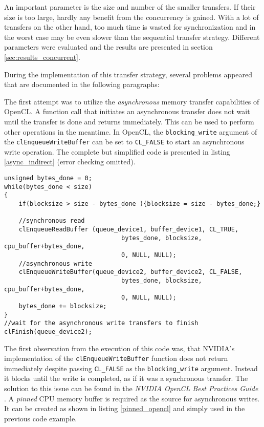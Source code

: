 An important parameter is the size and number of the smaller transfers.
If their size is too large, hardly any benefit from the concurrency is gained.
With a lot of transfers on the other hand, too much time is wasted for synchronization and in the worst case may be even slower than the sequential transfer strategy.
Different parameters were evaluated and the results are presented in section \ref{sec:results_concurrent}.


During the implementation of this transfer strategy, several problems appeared that are documented in the following paragraphs:

The first attempt was to utilize the \emph{asynchronous} memory transfer capabilities of OpenCL.
A function call that initiates an asynchronous transfer does not wait until the transfer is done and returns immediately.
This can be used to perform other operations in the meantime.
In OpenCL, the \texttt{blocking\_write} argument of the \texttt{clEnqueueWriteBuffer} can be set to \texttt{CL\_FALSE} to start an asynchronous write operation.
The complete but simplified code is presented in listing \ref{async_indirect} (error checking omitted).

\begin{lstlisting}[label=async_indirect,morekeywords={CL_TRUE, CL_FALSE},caption= Asynchronous indirect device to device transfer]
unsigned bytes_done = 0;
while(bytes_done < size)
{
	if(blocksize > size - bytes_done ){blocksize = size - bytes_done;}
	
	//synchronous read
	clEnqueueReadBuffer (queue_device1, buffer_device1, CL_TRUE, 
	                            bytes_done, blocksize, cpu_buffer+bytes_done,
	                            0, NULL, NULL);
	//asynchronous write
	clEnqueueWriteBuffer(queue_device2, buffer_device2, CL_FALSE, 
	                            bytes_done, blocksize, cpu_buffer+bytes_done,
	                            0, NULL, NULL);
	bytes_done += blocksize;
}
//wait for the asynchronous write transfers to finish
clFinish(queue_device2);
\end{lstlisting}

The first observation from the execution of this code was, that NVIDIA's implementation of the \texttt{clEnqueueWriteBuffer} function does not return immediately despite passing \texttt{CL\_FALSE} as the \texttt{blocking\_write} argument. 
Instead it blocks until the write is completed, as if it was a synchronous transfer.
The solution to this issue can be found in the \emph{NVIDIA OpenCL Best Practices Guide} \cite{nvidia_cl_best_practices}.
A \emph{pinned} CPU memory buffer is required as the source for asynchronous writes.
It can be created as shown in listing \ref{pinned_opencl} and simply used in the previous code example.

